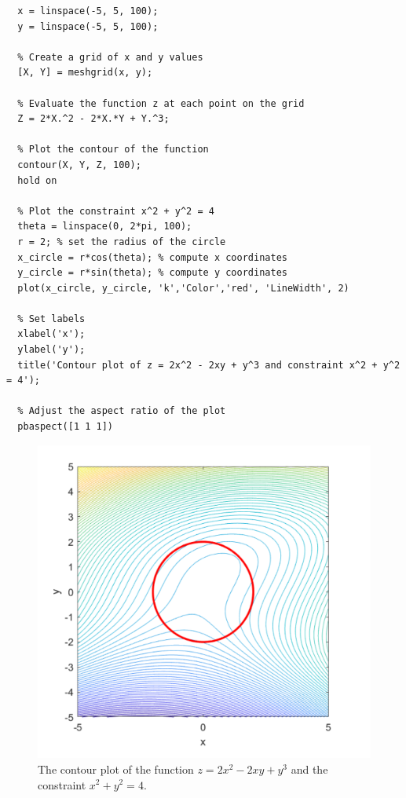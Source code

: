 \begin{lstlisting}[style=Matlab-editor]
  % Define the range of values for x and y
  x = linspace(-5, 5, 100);
  y = linspace(-5, 5, 100);
  
  % Create a grid of x and y values
  [X, Y] = meshgrid(x, y);
  
  % Evaluate the function z at each point on the grid
  Z = 2*X.^2 - 2*X.*Y + Y.^3;
  
  % Plot the contour of the function
  contour(X, Y, Z, 100);
  hold on
  
  % Plot the constraint x^2 + y^2 = 4
  theta = linspace(0, 2*pi, 100);
  r = 2; % set the radius of the circle
  x_circle = r*cos(theta); % compute x coordinates
  y_circle = r*sin(theta); % compute y coordinates
  plot(x_circle, y_circle, 'k','Color','red', 'LineWidth', 2)
  
  % Set labels
  xlabel('x');
  ylabel('y');
  title('Contour plot of z = 2x^2 - 2xy + y^3 and constraint x^2 + y^2 = 4');
  
  % Adjust the aspect ratio of the plot
  pbaspect([1 1 1])  
\end{lstlisting}

\begin{figure}[H]
  \centering
  \includegraphics[width=12cm]{graphics/2b.png}
  \caption{The contour plot of the function $z = 2x^2 - 2xy + y^3$ and the constraint $x^2 + y^2 = 4$.}
\end{figure}

\vspace*{1cm}

